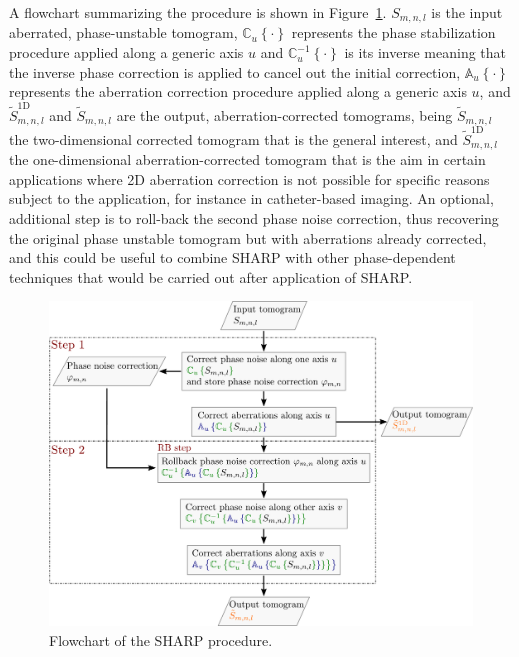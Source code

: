 A flowchart summarizing the procedure is shown in Figure~\ref{fig:SHARPFlowDiag}. $S_{m,n,l}$ is the input aberrated, phase-unstable tomogram, $\mathbb{C}_u\left\{\cdot\right\}$ represents the phase stabilization procedure applied along a generic axis $u$  and $\mathbb{C}_u^{-1}\left\{\cdot\right\}$ is its inverse meaning that the inverse phase correction is applied to cancel out the initial correction, $\mathbb{A}_u\left\{\cdot\right\}$ represents the aberration correction procedure applied along a generic axis $u$, and $\tilde{S}^{\text{1D}}_{m,n,l}$ and $\tilde{S}_{m,n,l}$ are the output, aberration-corrected tomograms, being $\tilde{S}_{m,n,l}$ the two-dimensional corrected tomogram that is the general interest, and $\tilde{S}^{\text{1D}}_{m,n,l}$ the one-dimensional aberration-corrected tomogram that is the aim in certain applications where 2D aberration correction is not possible for specific reasons subject to the application, for instance in catheter-based imaging. An optional, additional step is to roll-back the second phase noise correction, thus recovering the original phase unstable tomogram but with aberrations already corrected, and this could be useful to combine SHARP with other phase-dependent techniques that would be carried out after application of SHARP.

\begin{figure}[htb!]
	\centering
	\includegraphics[width=\textwidth]{Figures/SHARP/BlockDiagram.pdf}
	\caption[Flowchart of the SHARP procedure.]{Flowchart of the SHARP procedure.}
	\label{fig:SHARPFlowDiag}
\end{figure}

